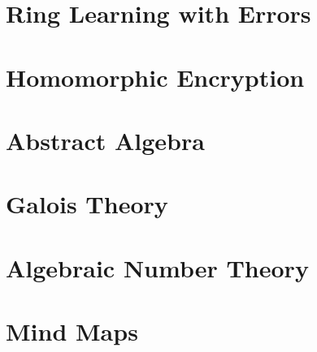 \documentclass[letterpaper]{article}
\begin{document}
\newpage
\section{Ring Learning with Errors}


\newpage
\section{Homomorphic Encryption}


\newpage
\appendix
\section{Abstract Algebra}


\newpage
\section{Galois Theory}


\newpage
\section{Algebraic Number Theory}


\newpage
\section{Mind Maps}\label{sec:mind maps}



\newpage
{}


\newpage
\printindex
\end{document}
